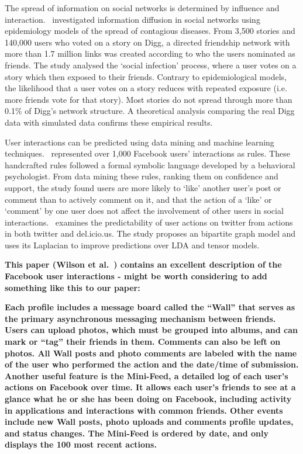 \documentclass[letterpaper]{article}
\begin{document}
The spread of information on social networks is determined by influence and interaction.~\cite{ver2011stops} investigated information diffusion in social networks using epidemiology models of the spread of contagious diseases. From 3,500 stories and 140,000 users who voted on a story on Digg, a directed friendship network with more than 1.7 million links was created according to who the users nominated as friends. The study analysed the `social infection' process, where a user votes on a story which then exposed to their friends. Contrary to epidemiological models, the likelihood that a user votes on a story reduces with repeated exposure (i.e. more friends vote for that story). Most stories do not spread through more than 0.1\% of Digg’s network structure. A theoretical analysis comparing the real Digg data with simulated data confirms these empirical results.


User interactions can be predicted using data mining and machine learning techniques.~\cite{gomes2011social} represented over 1,000 Facebook users' interactions as rules. These handcrafted rules followed a formal symbolic language developed by a behavioral psychologist. From data mining these rules, ranking them on confidence and support, the study found users are more likely to `like' another user's post or comment than to actively comment on it, and that the action of a `like' or `comment' by one user does not affect the involvement of other users in social interactions.~\cite{nori2011exploiting} examines the predictability of user actions on twitter from actions in both twitter and del.icio.us. The study proposes an bipartite graph model and uses its Laplacian to improve predictions over LDA and tensor models.


\textbf{This paper (Wilson et al.~\cite{wilson2009user}) contains an excellent description of the Facebook user interactions - might be worth considering to add something like this to our paper:}


\textbf{Each profile includes a message board called the “Wall” that serves as the primary asynchronous messaging mechanism between friends. Users can upload photos, which must be grouped into albums, and can mark or “tag” their friends in them. Comments can also be left on photos. All Wall posts and photo comments are labeled with the name of the user who performed the action and the date/time of submission. Another useful feature is the Mini-Feed, a detailed log of each user’s actions on Facebook over time. It allows each user’s friends to see at a glance what he or she has been doing on Facebook, including activity in applications and interactions with common friends. Other events include new Wall posts, photo uploads and comments profile updates, and status changes. The Mini-Feed is ordered by date, and only displays the 100 most recent actions.}
\end{document}
